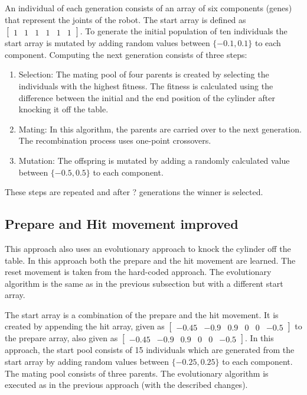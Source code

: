 An individual of each generation consists of an array of six components (genes) that represent the joints of the robot. The start array is defined as $\begin{bmatrix}
				1 & 1 & 1 & 1 & 1 & 1
				\end{bmatrix}$.
To generate the initial population of ten individuals the start array is mutated by adding random values between $\{-0.1,0.1\}$ to each component.
Computing the next generation consists of three steps:
\begin{enumerate}
\item Selection: The mating pool of four parents is created by selecting the individuals with the highest fitness. The fitness is calculated using the difference between the initial and the end position of the cylinder after knocking it off the table.

\item Mating: In this algorithm, the parents are carried over to the next generation. The recombination process uses one-point crossovers. 

\item Mutation: The offspring is mutated by adding a randomly calculated value between $\{-0.5,0.5\}$ to each component.
\end{enumerate}

These steps are repeated and after ? generations the winner is selected.

\subsection{Prepare and Hit movement improved} 

This approach also uses an evolutionary approach to knock the cylinder off the table. In this approach both the prepare and the hit movement are learned. The reset movement is taken from the hard-coded approach. The evolutionary algorithm is the same as in the previous subsection but with a different start array. 

The start array is a combination of the prepare and the hit movement. It is  created by appending the hit array, given as  
$\begin{bmatrix}
-0.45 &  -0.9 & 0.9 & 0 & 0 & -0.5
\end{bmatrix}$ 
to the prepare array, also given as
$\begin{bmatrix}
-0.45 &  -0.9 & 0.9 & 0 & 0 & -0.5
\end{bmatrix}$.
In this approach, the start pool consists of 15 individuals which are generated from the start array by adding random values between $\{-0.25,0.25\}$ to each component. The mating pool consists of three parents.
The evolutionary algorithm is executed as in the previous approach (with the described changes).

